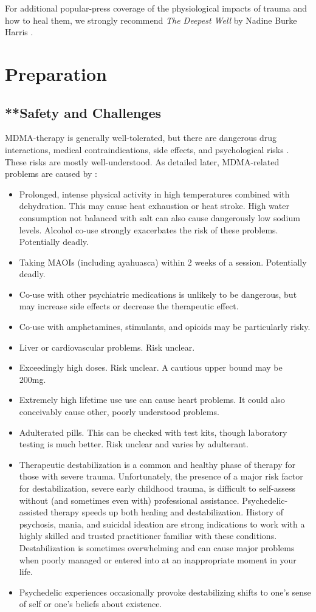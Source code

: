 \documentclass[12pt,letterpaper]{book}
\begin{document}
For additional popular-press coverage of the physiological impacts of trauma and how to heal them, we strongly recommend \textit{The Deepest Well} by Nadine Burke Harris \cite{harris2018deepest}.
\chapter{Preparation}
\section{**Safety and Challenges}
\label{sec:safety}
MDMA-therapy is generally well-tolerated, but there are dangerous drug interactions, medical contraindications, side effects, and psychological risks \cite{wolfgang2025}. These risks are mostly well-understood. As detailed later, MDMA-related problems are caused by \cite{wolfgang2025,riggDeaths,roxburghDeaths}:
\begin{itemize}
    \item Prolonged, intense physical activity in high temperatures combined with dehydration. This may cause heat exhaustion or heat stroke. High water consumption not balanced with salt can also cause dangerously low sodium levels. Alcohol co-use strongly exacerbates the risk of these problems. Potentially deadly.
    \item Taking MAOIs (including ayahuasca) within 2 weeks of a session. Potentially deadly.
    \item Co-use with other psychiatric medications is unlikely to be dangerous, but may increase side effects or decrease the therapeutic effect.
    \item Co-use with amphetamines, stimulants, and opioids may be particularly risky.
    \item Liver or cardiovascular problems. Risk unclear.
    \item Exceedingly high doses. Risk unclear. A cautious upper bound may be 200mg.
    \item Extremely high lifetime use use can cause heart problems. It could also conceivably cause other, poorly understood problems.
    \item Adulterated pills. This can be checked with test kits, though laboratory testing is much better. Risk unclear and varies by adulterant.
    \item Therapeutic destabilization is a common and healthy phase of therapy for those with severe trauma. Unfortunately, the presence of a major risk factor for destabilization, severe early childhood trauma, is difficult to self-assess without (and sometimes even with) professional assistance. Psychedelic-assisted therapy speeds up both healing and destabilization. History of psychosis, mania, and suicidal ideation are strong indications to work with a highly skilled and trusted practitioner familiar with these conditions. Destabilization is sometimes overwhelming and can cause major problems when poorly managed or entered into at an inappropriate moment in your life.
    \item Psychedelic experiences occasionally provoke destabilizing shifts to one's sense of self or one's beliefs about existence.
\end{itemize}
\end{document}
